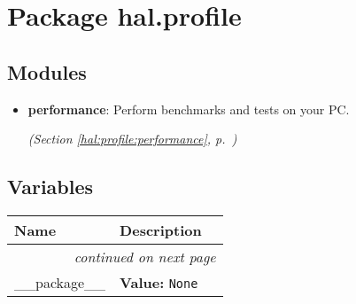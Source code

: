 %
%
%


\section{Package hal.profile}

    \label{hal:profile}


\subsection{Modules}

\begin{itemize}
\setlength{\parskip}{0ex}
\item \textbf{performance}: Perform benchmarks and tests on your PC. 


  \textit{(Section \ref{hal:profile:performance}, p.~\pageref{hal:profile:performance})}

\end{itemize}



  \subsection{Variables}

    \vspace{-1cm}
\hspace{\varindent}\begin{longtable}{|p{\varnamewidth}|p{\vardescrwidth}|l}
\cline{1-2}
\cline{1-2} \centering \textbf{Name} & \centering \textbf{Description}& \\
\cline{1-2}
\endhead\cline{1-2}\multicolumn{3}{r}{\small\textit{continued on next page}}\\\endfoot\cline{1-2}
\endlastfoot\raggedright \_\-\_\-p\-a\-c\-k\-a\-g\-e\-\_\-\_\- & \raggedright \textbf{Value:} 
{\tt None}&\\
\cline{1-2}
\end{longtable}

